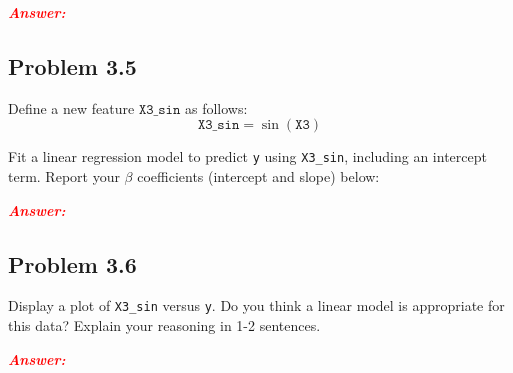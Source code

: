 \documentclass[11pt, letterpaper]{article}
\newcommand{\subproblem}[1]{\subsection*{Problem #1}}
\newcommand{\answer}{\textbf{\textit{\textcolor{red}{Answer:}}}\\}
\begin{document}
\answer

\subproblem{3.5}

Define a new feature $\texttt{X3\_sin}$ as follows: 
$$\texttt{X3\_sin} = \sin(\texttt{X3})$$

Fit a linear regression model to predict \texttt{y} using \texttt{X3\_sin}, including an intercept term.
Report your $\beta$ coefficients (intercept and slope) below:

\answer

\subproblem{3.6}

Display a plot of \texttt{X3\_sin} versus \texttt{y}. Do you think a linear model is appropriate for this data? Explain your reasoning in 1-2 sentences.

\answer
\end{document}
